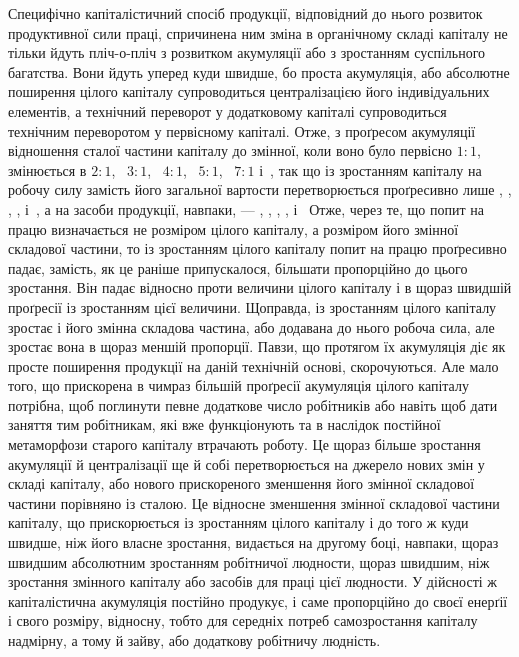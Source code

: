 Специфічно капіталістичний спосіб продукції, відповідний
до нього розвиток продуктивної сили праці, спричинена ним
зміна в органічному складі капіталу не тільки йдуть пліч-о-пліч
з розвитком акумуляції або з зростанням суспільного багатства.
Вони йдуть уперед куди швидше, бо проста акумуляція,
або абсолютне поширення цілого капіталу супроводиться централізацією
його індивідуальних елементів, а технічний переворот
у додатковому капіталі супроводиться технічним переворотом
у первісному капіталі. Отже, з проґресом акумуляції
відношення сталої частини капіталу до змінної, коли воно було
первісно $1: 1$, змінюється в $2: 1$,~ $3: 1$,~ $4: 1$,~ $5: 1$,~ $7: 1$ і~,
так що із зростанням капіталу на робочу силу замість  його
загальної вартости перетворюється проґресивно лише , ,
, ,  і~, а на засоби продукції, навпаки, — , , ,
,  і~ Отже, через те, що попит на працю визначається не
розміром цілого капіталу, а розміром його змінної складової
частини, то із зростанням цілого капіталу попит на працю проґресивно
падає, замість, як це раніше припускалося, більшати
пропорційно до цього зростання. Він падає відносно проти величини
цілого капіталу і в щораз швидшій проґресії із зростанням
цієї величини. Щоправда, із зростанням цілого капіталу зростає
і його змінна складова частина, або додавана до нього робоча
сила, але зростає вона в щораз меншій пропорції. Павзи, що протягом
їх акумуляція діє як просте поширення продукції на
даній технічній основі, скорочуються. Але мало того, що прискорена
в чимраз більшій проґресії акумуляція цілого капіталу
потрібна, щоб поглинути певне додаткове число робітників або
навіть щоб дати заняття тим робітникам, які вже функціонують
та в наслідок постійної метаморфози старого капіталу втрачають
роботу. Це щораз більше зростання акумуляції й централізації
ще й собі перетворюється на джерело нових змін у складі капіталу,
або нового прискореного зменшення його змінної складової
частини порівняно із сталою. Це відносне зменшення змінної
складової частини капіталу, що прискорюється із зростанням
цілого капіталу і до того ж куди швидше, ніж його власне зростання,
видається на другому боці, навпаки, щораз швидшим
абсолютним зростанням робітничої людности, щораз швидшим,
ніж зростання змінного капіталу або засобів для праці цієї людности.
У дійсності ж капіталістична акумуляція постійно продукує,
і саме пропорційно до своєї енерґії і свого розміру, відносну,
тобто для середніх потреб самозростання капіталу надмірну,
а тому й зайву, або додаткову робітничу людність.


